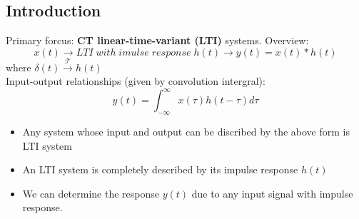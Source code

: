 \documentclass{article}
\theoremstyle{definition}
\begin{document}
\subsection{Introduction}
Primary forcus: \textbf{CT linear-time-variant (LTI)} systems.
Overview:\\
\begin{equation}
    x(t)\rightarrow \boxed{LTI\; with \; imulse\; response\; h(t)}\rightarrow y(t) = x(t) * h(t)
\end{equation}
where $ \delta(t) \mathop{\rightarrow}\limits^\mathcal{T} h(t) $\\
Input-output relationships (given by convolution intergral):
\begin{equation}
    y(t)=\int _{-\infty}^{\infty} x(\tau) h(t-\tau)d\tau
\end{equation}
\begin{itemize}
    \item Any system whose input and output can be discribed by the above form is LTI system
    \item An LTI system is completely described by its impulse response $ h(t) $
    \item We can determine the response $ y(t) $ due to any input signal with impulse response.
\end{itemize}
\end{document}
